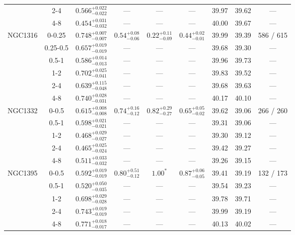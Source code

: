 \documentclass[structabstract]{aa}
\begin{document}
{{\begin{longtable}{lcccccccc}
 & 2-4 & $ 0.566 _{- 0.022 }^{+ 0.022 } $ & --- & --- & --- &  39.97 & 39.62 & --- \\
 & 4-8 & $ 0.454 _{- 0.032 }^{+ 0.031 } $ & --- & --- & --- &  40.00 & 39.67 & --- \\
\hline
NGC1316 & 0-0.25 & $ 0.748 _{- 0.007 }^{+ 0.007 } $ & $  0.54 _{-  0.06 }^{+  0.08 } $ & $  0.22 _{-  0.09 }^{+  0.11 } $ & $  0.44 _{-  0.01 }^{+  0.02 } $ &  39.99 & 39.39 &   586 /   615 \\
 & 0.25-0.5 & $ 0.657 _{- 0.019 }^{+ 0.019 } $ & --- & --- & --- &  39.68 & 39.30& --- \\
 & 0.5-1 & $ 0.586 _{- 0.013 }^{+ 0.014 } $ & --- & --- & --- &  39.96 & 39.73 & --- \\
 & 1-2 & $ 0.702 _{- 0.041 }^{+ 0.025 } $ & --- & --- & --- &  39.83 & 39.52 & --- \\
 & 2-4 & $ 0.639 _{- 0.048 }^{+ 0.115 } $ & --- & --- & --- &  39.68 & 39.63 & --- \\
 & 4-8 & $ 0.740 _{- 0.031 }^{+ 0.028 } $ & --- & --- & --- &  40.17 & 40.10 & --- \\
\hline
NGC1332 & 0-0.5 & $ 0.615 _{- 0.008 }^{+ 0.008 } $ & $  0.74 _{-  0.12 }^{+  0.16 } $ & $  0.82 _{-  0.27 }^{+  0.29 } $ & $  0.65 _{-  0.02 }^{+  0.05 } $ &  39.62 & 39.06 &   266 /   260 \\
 & 0.5-1 & $ 0.598 _{- 0.021 }^{+ 0.021 } $ & --- & --- & --- &  39.31 & 39.06 & --- \\
 & 1-2 & $ 0.468 _{- 0.027 }^{+ 0.029 } $ & --- & --- & --- &  39.30 & 39.12 & --- \\
 & 2-4 & $ 0.465 _{- 0.024 }^{+ 0.025 } $ & --- & --- & --- &  39.42 & 39.27 & --- \\
 & 4-8 & $ 0.511 _{- 0.032 }^{+ 0.033 } $ & --- & --- & --- &  39.26 & 39.15 & --- \\
\hline
NGC1395 & 0-0.5 & $ 0.592 _{- 0.019 }^{+ 0.019 } $ & $  0.80 _{-  0.12 }^{+  0.51 } $ & $ 1.00^{\ast} $ & $  0.87 _{-  0.05 }^{+  0.06 } $ &  39.41 & 39.19 &   132 /   173 \\
 & 0.5-1 & $ 0.520 _{- 0.035 }^{+ 0.050 } $ & --- & --- & --- &  39.54 & 39.23 & --- \\
 & 1-2 & $ 0.698 _{- 0.028 }^{+ 0.029 } $ & --- & --- & --- &  39.78 & 39.71 & --- \\
 & 2-4 & $ 0.743 _{- 0.019 }^{+ 0.019 } $ & --- & --- & --- &  39.99 & 39.19 & --- \\
 & 4-8 & $ 0.771 _{- 0.017 }^{+ 0.018 } $ & --- & --- & --- &  40.13 & 40.02 & --- \\

\end{longtable}}}
\end{document}
